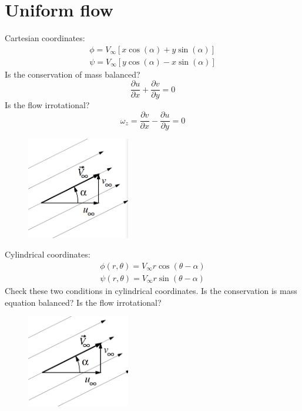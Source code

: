 \documentclass[class=report, crop=false, 12pt,a4paper]{standalone}
\begin{document}
\section{Uniform flow}
Cartesian coordinates:
\begin{gather}
  \phi = V_{\infty} \left[ x\cos(\alpha) + y\sin(\alpha) \right]\\
  \psi = V_{\infty} \left[ y\cos(\alpha) - x\sin(\alpha) \right]
\end{gather}
Is the conservation of mass balanced?
\begin{equation}
  \frac{\partial u}{\partial x} + \frac{\partial v}{\partial y} = 0
\end{equation}
Is the flow irrotational?
\begin{equation}
  \omega_z = \frac{\partial v}{\partial x} - \frac{\partial u}{\partial y} = 0
\end{equation}
\begin{figure}[H]
  \centering
  \includegraphics[width = 0.4\textwidth]{../img/diagram16.png}
\end{figure}
Cylindrical coordinates:
\begin{gather}
  \phi (r, \theta) = V_{\infty} r \cos(\theta - \alpha)\\
  \psi (r, \theta) = V_{\infty} r \sin(\theta - \alpha)
\end{gather}
Check these two conditions in cylindrical coordinates. Is the conservation is mass equation balanced? Is the flow irrotational?
\begin{figure}[H]
  \centering
  \includegraphics[width = 0.4\textwidth]{../img/diagram17.png}
\end{figure}
\end{document}
